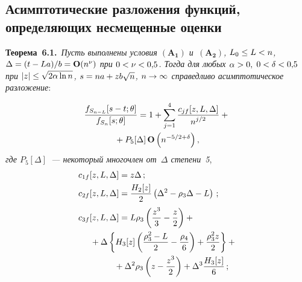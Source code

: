 \begin{multicols}{2}
\section{Асимптотические разложения функций, определяющих
  несмещенные оценки}

\noindent
\textbf{Теорема~6.1.}\
\textit{Пусть выполнены условия $\mathbf{(A_1)}$ и~$\mathbf{(A_2)}$, $L_0\hm\le L\hm<n$,
$\Delta\hm=(t-La)/b\hm=\mathbf {O}(n^\nu)$ при $0\hm<\nu\hm<0{,}5$.
Тогда для любых $\alpha\hm>0,$ $0\hm<\delta\hm<0{,}5$ при
$|z|\hm\le \sqrt{2\alpha\ln n}$, $s\hm=na\hm+zb\sqrt{n}$, $n\hm\rightarrow\infty$
справедливо асимптотическое разложение}:

\pagebreak

\noindent
 \begin{multline}
\displaystyle\frac{\displaystyle f_{S_{n-L}}[s-t;\theta]\mathstrut}{\displaystyle f_{S_n}[s;\theta]\mathstrut}
  =1+\sum\limits_{j=1}^4 \displaystyle\frac{\displaystyle c_{jf}[z,L,\Delta]\mathstrut}{\displaystyle n^{j/2}\mathstrut}+{}\\
  {}+
  P_5[\Delta]\,\mathbf{O}\left(n^{-5/2+\delta} \right),
 \label{T:6.1-1}
 \end{multline}
  \textit{где $P_5[\Delta]$~--- некоторый многочлен от~$\Delta$ степени~5},
 \begin{align*}
& c_{1f}[z,L,\Delta]=z\Delta\,;\\
& c_{2f}[z,L,\Delta]=\fr{H_2[z]}{2}\left( \Delta^2-\rho_3\Delta-L\right)\,;
\\
 &c_{3f}[z,L,\Delta]
  =L\rho_3\left(\fr{z^3}{3}-\fr{z}{2}\right)+{}\\
&\hspace*{5mm}{}+
   \Delta \left\{ H_3[z] \left(\fr{\rho_3^2-L}{2}-\fr{\rho_4}{6}\right)+
   \fr{\rho_3^2 z}{2}\right\}+{}\\
&\hspace*{15mm}{}   +\Delta^2\rho_3\left(z-\fr{z^3}{2}\right)+
    \Delta^3\fr{H_3[z]}{6}\,;
 \end{align*}

 \vspace*{-12pt}


\end{multicols}
